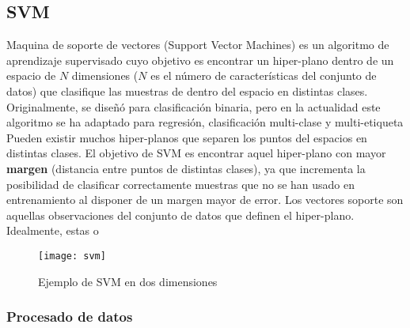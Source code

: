 \subsection{SVM}
Maquina de soporte de vectores (Support Vector Machines) es un algoritmo de aprendizaje supervisado cuyo objetivo es encontrar un hiper-plano dentro de un espacio de  $N$ dimensiones ($N$ es el número de características del conjunto de datos) que clasifique las muestras de dentro del espacio en distintas clases.  Originalmente, se diseñó para clasificación binaria, pero en la actualidad este algoritmo se ha adaptado para regresión, clasificación multi-clase y  multi-etiqueta\\
\linebreak
Pueden existir muchos hiper-planos que separen los puntos del espacios en distintas clases. El objetivo de SVM es encontrar aquel hiper-plano con mayor \textbf{margen} (distancia entre puntos de distintas clases),  ya que incrementa la posibilidad de clasificar correctamente muestras que no se han usado en entrenamiento al disponer de un margen mayor de error. Los vectores soporte son aquellas observaciones del conjunto de datos que definen el hiper-plano. Idealmente, estas o\\
\begin{figure}[H]
	\centering
	\texttt{[image: svm]}
	\caption{Ejemplo de SVM en dos dimensiones}
	\label{fig:svm}
\end{figure}

\subsubsection{Procesado de datos}
